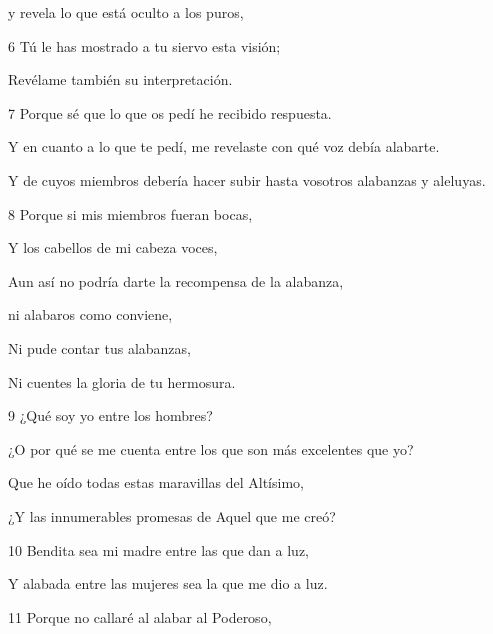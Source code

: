 \par y revela lo que está oculto a los puros,

\par [Quienes con fe se han sometido a ti y a tu ley.]

\par 6 Tú le has mostrado a tu siervo esta visión;

\par Revélame también su interpretación.

\par 7 Porque sé que lo que os pedí he recibido respuesta.

\par Y en cuanto a lo que te pedí, me revelaste con qué voz debía alabarte.

\par Y de cuyos miembros debería hacer subir hasta vosotros alabanzas y aleluyas.

\par 8 Porque si mis miembros fueran bocas,

\par Y los cabellos de mi cabeza voces,

\par Aun así no podría darte la recompensa de la alabanza,

\par ni alabaros como conviene,

\par Ni pude contar tus alabanzas,

\par Ni cuentes la gloria de tu hermosura.

\par 9 ¿Qué soy yo entre los hombres?

\par ¿O por qué se me cuenta entre los que son más excelentes que yo?

\par Que he oído todas estas maravillas del Altísimo,

\par ¿Y las innumerables promesas de Aquel que me creó?

\par 10 Bendita sea mi madre entre las que dan a luz,

\par Y alabada entre las mujeres sea la que me dio a luz.

\par 11 Porque no callaré al alabar al Poderoso,

